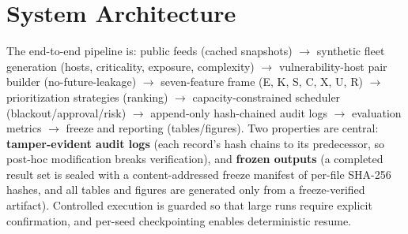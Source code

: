 \section{System Architecture}

The end-to-end pipeline is: public feeds (cached snapshots) $\rightarrow$ synthetic fleet
generation (hosts, criticality, exposure, complexity) $\rightarrow$ vulnerability-host pair
builder (no-future-leakage) $\rightarrow$ seven-feature frame (E, K, S, C, X, U, R) $\rightarrow$
prioritization strategies (ranking) $\rightarrow$ capacity-constrained scheduler
(blackout/approval/risk) $\rightarrow$ append-only hash-chained audit logs $\rightarrow$ evaluation metrics
$\rightarrow$ freeze and reporting (tables/figures). Two properties are central:
\textbf{tamper-evident audit logs} (each record's hash chains to its predecessor, so
post-hoc modification breaks verification), and \textbf{frozen outputs} (a completed
result set is sealed with a content-addressed freeze manifest of per-file SHA-256
hashes, and all tables and figures are generated only from a freeze-verified
artifact). Controlled execution is guarded so that large runs require explicit
confirmation, and per-seed checkpointing enables deterministic resume.
